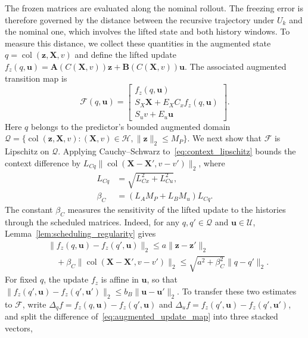 \documentclass[journal]{IEEEtran}
\newcommand{\vu}{\mathbf{u}}
\newcommand{\vz}{\mathbf{z}}
\newcommand{\mA}{\mathbf{A}}
\newcommand{\mB}{\mathbf{B}}
\newcommand{\mX}{\mathbf{X}}
\newcommand{\norm}[2][]{\mathopen{#1\lVert}#2\mathclose{#1\rVert}}
\newcommand{\col}{\operatorname{col}}
\theoremstyle{plain}
\theoremstyle{definition}
\theoremstyle{definition}
\begin{document}
The frozen matrices are evaluated along the nominal rollout. The
freezing error is therefore governed by the distance between the
recursive trajectory under $U_k$ and the nominal one, which involves
the lifted state and both history windows. To measure this distance,
we collect these quantities in the augmented state
$q=\col(\vz,\mX,v)$ and define the lifted update
$f_z(q,\vu)=\mA(C(\mX,v))\vz+\mB(C(\mX,v))\vu$. The associated
augmented transition map is
\begin{equation}
\mathcal F(q,\vu)=\begin{bmatrix}
f_z(q,\vu)\\ S_X\mX+E_XC_xf_z(q,\vu)\\ S_uv+E_u\vu
\end{bmatrix}.
\label{eq:augmented_update_map}
\end{equation}
Here $q$ belongs to the predictor's bounded augmented domain
$\mathcal Q=\{\col(\vz,\mX,v):(\mX,v)\in\mathcal H,
\norm{\vz}_2\le M_P\}$. We next show that $\mathcal F$ is Lipschitz on
$\mathcal Q$. Applying Cauchy--Schwarz
to~\eqref{eq:context_lipschitz} bounds the context difference by
$L_{Cq}\norm{\col(\mX-\mX',v-v')}_2$, where
\begin{equation}
\begin{aligned}
L_{Cq}&=\sqrt{L_{Cx}^2+L_{Cu}^2},\\
\beta_C&=(L_AM_P+L_BM_u)L_{Cq}.
\end{aligned}
\label{eq:augmented_sensitivity}
\end{equation}
The constant $\beta_C$ measures the sensitivity of the lifted update
to the histories through the scheduled matrices. Indeed, for any
$q,q'\in\mathcal Q$ and $\vu\in\mathcal U$,
Lemma~\ref{lem:scheduling_regularity} gives
\begin{equation*}
\begin{aligned}
&\norm{f_z(q,\vu)-f_z(q',\vu)}_2\le a\norm{\vz-\vz'}_2\\
&\quad+\beta_C\norm{\col(\mX-\mX',v-v')}_2
\le\sqrt{a^2+\beta_C^2}\norm{q-q'}_2.
\end{aligned}
\end{equation*}
For fixed $q$, the update $f_z$ is affine in $\vu$, so that
$\norm{f_z(q',\vu)-f_z(q',\vu')}_2\le b_B\norm{\vu-\vu'}_2$. To
transfer these two estimates to $\mathcal F$, write
$\Delta_qf=f_z(q,\vu)-f_z(q',\vu)$ and
$\Delta_uf=f_z(q',\vu)-f_z(q',\vu')$, and split the difference
of~\eqref{eq:augmented_update_map} into three stacked vectors,
\end{document}
